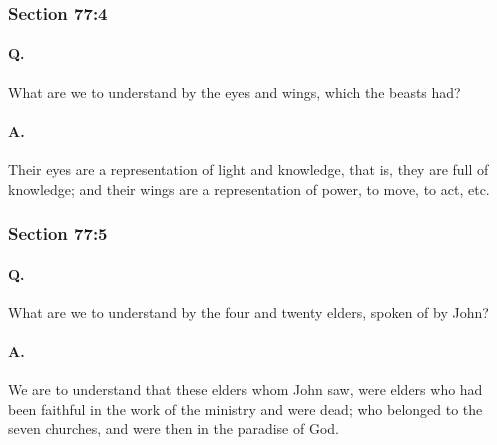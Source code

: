 	\subsubsection{Section 77:4} %
		\label{DC77-4}

		\paragraph{Q.}

			What are we to understand by the eyes and wings, which the beasts had?

		\paragraph{A.}
		
			Their eyes are a representation of light and knowledge, that is, they are full of knowledge; and their wings are a representation of power, to move, to act, etc.


	\subsubsection{Section 77:5} %
		\label{DC77-5}

		\paragraph{Q.}

			What are we to understand by the four and twenty elders, spoken of by John?

		\paragraph{A.}
		
			We are to understand that these elders whom John saw, were elders who had been faithful in the work of the ministry and were dead; who belonged to the seven churches, and were then in the paradise of God.


